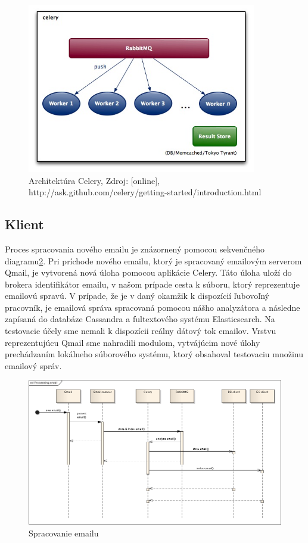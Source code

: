 \documentclass[11pt,twoside,a4paper]{book}
\begin{document}
\begin{figure}[h]
 \centering
 \includegraphics[width=10cm]{./figures/Celery.jpg}
 \caption{Architektúra Celery, Zdroj: [online], http://ask.github.com/celery/getting-started/introduction.html}
 \label{fig:Celery}
\end{figure}



\subsection{Klient}

Proces spracovania nového emailu je znázornený pomocou sekvenčného diagramu\ref{fig:Cseq}. Pri príchode nového emailu, ktorý je spracovaný emailovým serverom Qmail, je vytvorená nová úloha pomocou aplikácie Celery. Táto úloha uloží do brokera identifikátor emailu, v našom prípade cesta k súboru, ktorý reprezentuje emailovú spravú. V prípade, že je v daný okamžik k dispozícií ľubovoľný pracovník, je emailová správa spracovaná pomocou nášho analyzátora a následne zapísaná do databáze Cassandra a fultextového systému Elasticsearch. Na testovacie účely sme nemali k dispozícii reálny dátový tok emailov. Vrstvu reprezentujúcu Qmail sme nahradili modulom, vytvájúcim nové úlohy prechádzaním lokálneho súborového systému, ktorý obsahoval testovaciu množinu emailový správ.




\begin{figure}[h]
 \centering
 \includegraphics[width=16cm]{./figures/emailProcessing.png}
 \caption{Spracovanie emailu}
 \label{fig:Cseq}
\end{figure}
\end{document}
